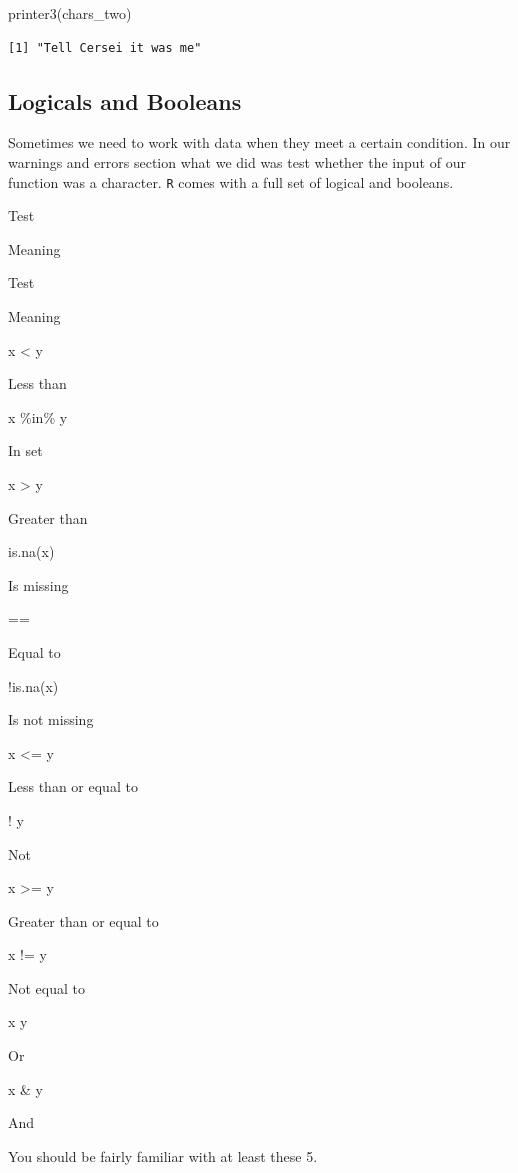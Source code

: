 \documentclass[
  letterpaper,
  DIV=11,
  numbers=noendperiod,
  oneside]{scrreprt}
\newenvironment{Shaded}{\begin{snugshade}}{\end{snugshade}}
\newcommand{\FunctionTok}[1]{\textcolor[rgb]{0.28,0.35,0.67}{#1}}
\newcommand{\NormalTok}[1]{\textcolor[rgb]{0.00,0.23,0.31}{#1}}
\begin{document}
\begin{Shaded}
\begin{Highlighting}[]
\FunctionTok{printer3}\NormalTok{(chars\_two)}
\end{Highlighting}
\end{Shaded}

\begin{verbatim}
[1] "Tell Cersei it was me"
\end{verbatim}

\hypertarget{logicals-and-booleans}{%
\subsection{Logicals and Booleans}\label{logicals-and-booleans}}

Sometimes we need to work with data when they meet a certain condition.
In our warnings and errors section what we did was test whether the
input of our function was a character. \texttt{R} comes with a full set
of logical and booleans.

Test

Meaning

Test

Meaning

x \textless{} y

Less than

x \%in\% y

In set

x \textgreater{} y

Greater than

is.na(x)

Is missing

==

Equal to

!is.na(x)

Is not missing

x \textless= y

Less than or equal to

! y

Not

x \textgreater= y

Greater than or equal to

x != y

Not equal to

x \textbar{} y

Or

x \& y

And

You should be fairly familiar with at least these 5.
\end{document}
